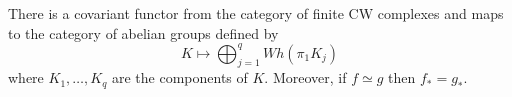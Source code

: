 There is a covariant functor from the category of finite CW complexes and maps to the category of abelian groups defined by
$$K \mapsto \bigoplus_{j=1}^{q} Wh(\pi_1 K_j)$$
where $K_1, \ldots, K_q$ are the components of $K$. Moreover, if $f \simeq g$ then $f_* = g_*$.
